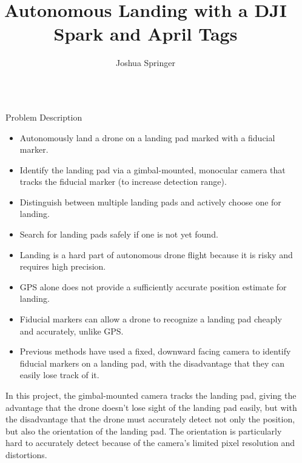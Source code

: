 \documentclass[final, 20pt]{beamer}
\title{Autonomous Landing with a DJI Spark and April Tags}
\author{Joshua Springer}
\institute[shortinst]{Reykjavík University}
\newlength{\sepwidth}
\newlength{\colwidth}
\newcommand{\separatorcolumn}{\begin{column}{\sepwidth}\end{column}}
\begin{document}
\begin{frame}[t]
\begin{columns}[t]
\separatorcolumn

\begin{column}{\colwidth}

  \begin{alertblock}{Problem Description}


    \begin{itemize}
      \item Autonomously land a drone on a landing pad marked with a fiducial marker.
      \item Identify the landing pad via a gimbal-mounted, monocular camera that tracks the fiducial marker (to increase detection range).
      \item Distinguish between multiple landing pads and actively choose one for landing.
      \item Search for landing pads safely if one is not yet found.
    \end{itemize}


    \begin{itemize}
      \item Landing is a hard part of autonomous drone flight because it is risky and requires high precision.
      \item GPS alone does not provide a sufficiently accurate position estimate for landing.
      \item Fiducial markers can allow a drone to recognize a landing pad cheaply and accurately, unlike GPS.
      \item Previous methods have used a fixed, downward facing camera to identify fiducial markers on a landing pad,
            with the disadvantage that they can easily lose track of it.
    \end{itemize}


    In this project, the gimbal-mounted camera tracks the landing pad,
    giving the advantage that the drone doesn't lose sight of the landing pad easily,
    but with the disadvantage that the drone must accurately detect not only the position,
    but also the orientation of the landing pad.
    The orientation is particularly hard to accurately detect because of the camera's limited pixel resolution and distortions.


\end{alertblock}
\end{column}
\end{columns}
\end{frame}
\end{document}
